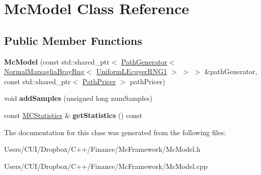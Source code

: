 \hypertarget{class_mc_model}{}\section{Mc\+Model Class Reference}
\label{class_mc_model}
\subsection*{Public Member Functions}
\begin{DoxyCompactItemize}
\item 
\hypertarget{class_mc_model_ac8cfd885b4baeabe5c20ad56ce1803f0}{}\label{class_mc_model_ac8cfd885b4baeabe5c20ad56ce1803f0} 
{\bfseries Mc\+Model} (const std\+::shared\+\_\+ptr$<$ \hyperlink{class_path_generator}{Path\+Generator}$<$ \hyperlink{class_normal_marsaglia_bray_rng}{Normal\+Marsaglia\+Bray\+Rng}$<$ \hyperlink{class_uniform_l_ecuyer_r_n_g1}{Uniform\+L\+Ecuyer\+R\+N\+G1} $>$ $>$ $>$ \&path\+Generator, const std\+::shared\+\_\+ptr$<$ \hyperlink{class_path_pricer}{Path\+Pricer} $>$ path\+Pricer)
\item 
\hypertarget{class_mc_model_a81f56ed90c002927bdec595eb52c57c3}{}\label{class_mc_model_a81f56ed90c002927bdec595eb52c57c3} 
void {\bfseries add\+Samples} (unsigned long num\+Samples)
\item 
\hypertarget{class_mc_model_afc977c490efd468506d7436901a72177}{}\label{class_mc_model_afc977c490efd468506d7436901a72177} 
const \hyperlink{class_m_c_statistics}{M\+C\+Statistics} \& {\bfseries get\+Statistics} () const
\end{DoxyCompactItemize}


The documentation for this class was generated from the following files\+:\begin{DoxyCompactItemize}
\item 
Users/\+C\+U\+I/\+Dropbox/\+C++/\+Finance/\+Mc\+Framework/Mc\+Model.\+h\item 
Users/\+C\+U\+I/\+Dropbox/\+C++/\+Finance/\+Mc\+Framework/Mc\+Model.\+cpp\end{DoxyCompactItemize}
